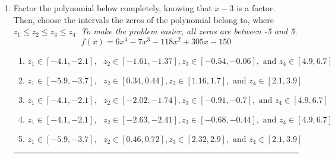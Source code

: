 \documentclass[14pt]{extbook}
\newcommand{\litem}[1]{\item#1\hspace*{-1cm}\rule{\textwidth}{0.4pt}}
\begin{document}
\begin{enumerate}
{\begin{enumerate}[label=\Alph*.]
\end{enumerate} }
\litem{
Factor the polynomial below completely, knowing that $x-3$ is a factor. Then, choose the intervals the zeros of the polynomial belong to, where $z_1 \leq z_2 \leq z_3 \leq z_4$. \textit{To make the problem easier, all zeros are between -5 and 5.}\[ f(x) = 6x^{4} -7 x^{3} -118 x^{2} +305 x -150 \]\begin{enumerate}[label=\Alph*.]
\item \( z_1 \in [-4.1, -2.1], \text{   }  z_2 \in [-1.61, -1.37], z_3 \in [-0.54, -0.06], \text{   and   } z_4 \in [4.9, 6.7] \)
\item \( z_1 \in [-5.9, -3.7], \text{   }  z_2 \in [0.34, 0.44], z_3 \in [1.16, 1.7], \text{   and   } z_4 \in [2.1, 3.9] \)
\item \( z_1 \in [-4.1, -2.1], \text{   }  z_2 \in [-2.02, -1.74], z_3 \in [-0.91, -0.7], \text{   and   } z_4 \in [4.9, 6.7] \)
\item \( z_1 \in [-4.1, -2.1], \text{   }  z_2 \in [-2.63, -2.41], z_3 \in [-0.68, -0.44], \text{   and   } z_4 \in [4.9, 6.7] \)
\item \( z_1 \in [-5.9, -3.7], \text{   }  z_2 \in [0.46, 0.72], z_3 \in [2.32, 2.9], \text{   and   } z_4 \in [2.1, 3.9] \)

\end{enumerate} }
\end{enumerate}
\end{document}
